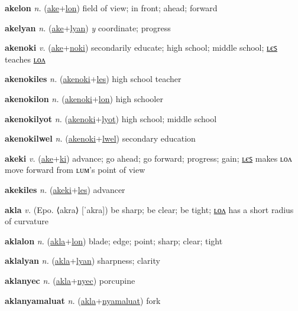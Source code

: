 \textbf{\hypertarget{akelon}{akelon}} \textit{n.} (\hyperlink{ake}{ake}+\allowbreak \hyperlink{lon}{lon})
field of view; in front; ahead; forward

\textbf{\hypertarget{akelyan}{akelyan}} \textit{n.} (\hyperlink{ake}{ake}+\allowbreak \hyperlink{lyan}{lyan})
\textit{y} coordinate; progress

\textbf{\hypertarget{akenoki}{akenoki}} \textit{v.} (\hyperlink{ake}{ake}+\allowbreak \hyperlink{noki}{noki})
secondarily educate; high school; middle school; \hyperlink{akenokiles}{ʟєꜱ} teaches \hyperlink{akenokilon}{ʟᴏᴧ}

\textbf{\hypertarget{akenokiles}{akenokiles}} \textit{n.} (\hyperlink{akenoki}{akenoki}+\allowbreak \hyperlink{les}{les})
high school teacher

\textbf{\hypertarget{akenokilon}{akenokilon}} \textit{n.} (\hyperlink{akenoki}{akenoki}+\allowbreak \hyperlink{lon}{lon})
high schooler

\textbf{\hypertarget{akenokilyot}{akenokilyot}} \textit{n.} (\hyperlink{akenoki}{akenoki}+\allowbreak \hyperlink{lyot}{lyot})
high school; middle school

\textbf{\hypertarget{akenokilwel}{akenokilwel}} \textit{n.} (\hyperlink{akenoki}{akenoki}+\allowbreak \hyperlink{lwel}{lwel})
secondary education

\textbf{\hypertarget{akeki}{akeki}} \textit{v.} (\hyperlink{ake}{ake}+\allowbreak \hyperlink{ki}{ki})
advance; go ahead; go forward; progress; gain; \hyperlink{akekiles}{ʟєꜱ} makes ʟᴏᴧ move forward from ʟᴜᴍ’s point of view

\textbf{\hypertarget{akekiles}{akekiles}} \textit{n.} (\hyperlink{akeki}{akeki}+\allowbreak \hyperlink{les}{les})
advancer

\textbf{\hypertarget{akla}{akla}} \textit{v.} (Epo. ⟨akra⟩ [ˈakra])
be sharp; be clear; be tight; \hyperlink{aklalon}{ʟᴏᴧ} has a short radius of curvature

\textbf{\hypertarget{aklalon}{aklalon}} \textit{n.} (\hyperlink{akla}{akla}+\allowbreak \hyperlink{lon}{lon})
blade; edge; point; sharp; clear; tight

\textbf{\hypertarget{aklalyan}{aklalyan}} \textit{n.} (\hyperlink{akla}{akla}+\allowbreak \hyperlink{lyan}{lyan})
sharpness; clarity

\textbf{\hypertarget{aklanyec}{aklanyec}} \textit{n.} (\hyperlink{akla}{akla}+\allowbreak \hyperlink{nyec}{nyec})
porcupine

\textbf{\hypertarget{aklanyamaluat}{aklanyamaluat}} \textit{n.} (\hyperlink{akla}{akla}+\allowbreak \hyperlink{nyamaluat}{nyamaluat})
fork

